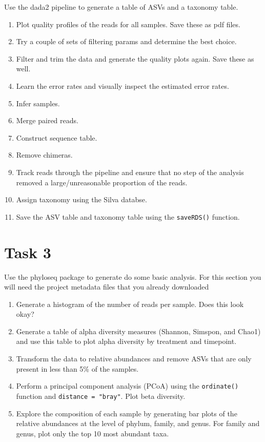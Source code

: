 \documentclass[
]{book}
\providecommand{\tightlist}{%
  \setlength{\itemsep}{0pt}\setlength{\parskip}{0pt}}
\begin{document}
Use the dada2 pipeline to generate a table of ASVs and a taxonomy table.

\begin{enumerate}
\def\labelenumi{\arabic{enumi}.}
\tightlist
\item
  Plot quality profiles of the reads for all samples. Save these as pdf files.
\item
  Try a couple of sets of filtering params and determine the best choice.
\item
  Filter and trim the data and generate the quality plots again. Save these as well.
\item
  Learn the error rates and visually inspect the estimated error rates.
\item
  Infer samples.
\item
  Merge paired reads.
\item
  Construct sequence table.
\item
  Remove chimeras.
\item
  Track reads through the pipeline and ensure that no step of the analysis removed a large/unreasonable proportion of the reads.
\item
  Assign taxonomy using the Silva databse.
\item
  Save the ASV table and taxonomy table using the \texttt{saveRDS()} function.
\end{enumerate}

\hypertarget{task-3}{%
\section{Task 3}\label{task-3}}

Use the phyloseq package to generate do some basic analysis. For this section you will need the project metadata files that you already downloaded

\begin{enumerate}
\def\labelenumi{\arabic{enumi}.}
\tightlist
\item
  Generate a histogram of the number of reads per sample. Does this look okay?
\item
  Generate a table of alpha diversity measures (Shannon, Simspon, and Chao1) and use this table to plot alpha diversity by treatment and timepoint.
\item
  Transform the data to relative abundances and remove ASVs that are only present in less than 5\% of the samples.
\item
  Perform a principal component analysis (PCoA) using the \texttt{ordinate()} function and \texttt{distance\ =\ "bray"}. Plot beta diversity.
\item
  Explore the composition of each sample by generating bar plots of the relative abundances at the level of phylum, family, and genus. For family and genus, plot only the top 10 most abundant taxa.
\end{enumerate}
\end{document}
